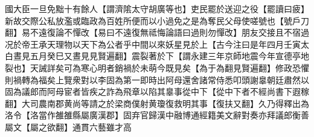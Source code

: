 國大臣一旦免黜十有餘人【謂濟隂太守胡廣等也】吏民罷於送迎之役【罷讀曰疲】新故交際公私放濫或臨政為百姓所便而以小過免之是為奪民父母使嗟號也【號戶刀翻】易不遠復論不憚改【易曰不遠復無祗悔論語曰過則勿憚改】朋友交接且不宿過况於帝王承天理物以天下為公者乎中間以來妖星見於上【古今注曰是年四月壬寅太白晝見五月癸巳又晝見見賢遍翻】震裂著於下【謂永建三年京師地震今年宣德亭地裂也】天誡詳矣可為寒心明者銷禍於未萌今既見矣【為于為翻見賢遍翻】修政恐懼則禍轉為福矣上覽衆對以李固為第一即時出阿母還舍諸常侍悉叩頭謝辠朝廷肅然以固為議郎而阿母宦者皆疾之詐為飛章以陷其辠事從中下【從中下者不經尚書下遐稼翻】大司農南郡黄尚等請之於梁商僕射黄瓊復救明其事【復扶又翻】久乃得釋出為洛令【洛當作雒雒縣屬廣漢郡】固弃官歸漢中融博通經籍美文辭對奏亦拜議郎衡善屬文【屬之欲翻】通貫六藝雖才高